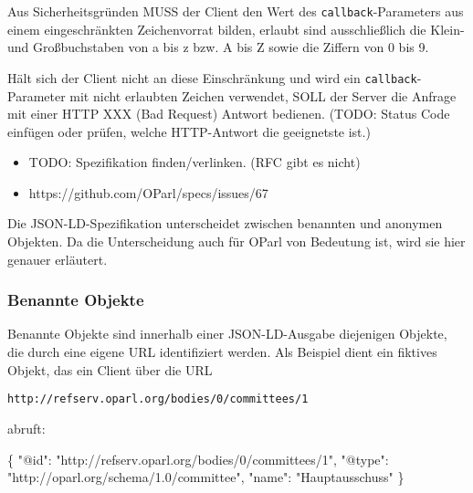 \documentclass[,a4paper]{article}
\newenvironment{Shaded}{}{}
\newcommand{\DataTypeTok}[1]{\textcolor[rgb]{0.56,0.13,0.00}{{#1}}}
\newcommand{\StringTok}[1]{\textcolor[rgb]{0.25,0.44,0.63}{{#1}}}
\newcommand{\NormalTok}[1]{{#1}}
\begin{document}
Aus Sicherheitsgründen MUSS der Client den Wert des
\texttt{callback}-Parameters aus einem eingeschränkten Zeichenvorrat
bilden, erlaubt sind ausschließlich die Klein- und Großbuchstaben von a
bis z bzw. A bis Z sowie die Ziffern von 0 bis 9.

Hält sich der Client nicht an diese Einschränkung und wird ein
\texttt{callback}-Parameter mit nicht erlaubten Zeichen verwendet, SOLL
der Server die Anfrage mit einer HTTP XXX (Bad Request) Antwort
bedienen. (TODO: Status Code einfügen oder prüfen, welche HTTP-Antwort
die geeignetste ist.)

\begin{itemize}
\itemsep1pt\parskip0pt
\item
  TODO: Spezifikation finden/verlinken. (RFC gibt es nicht)
\item
  https://github.com/OParl/specs/issues/67
\end{itemize}


Die JSON-LD-Spezifikation unterscheidet zwischen benannten und anonymen
Objekten. Da die Unterscheidung auch für OParl von Bedeutung ist, wird
sie hier genauer erläutert.

\subsubsection{Benannte Objekte}\label{benannte-objekte}

Benannte Objekte sind innerhalb einer JSON-LD-Ausgabe diejenigen
Objekte, die durch eine eigene URL identifiziert werden. Als Beispiel
dient ein fiktives Objekt, das ein Client über die URL

\begin{verbatim}
http://refserv.oparl.org/bodies/0/committees/1
\end{verbatim}

abruft:

\begin{Shaded}
\begin{Highlighting}[]
\NormalTok{\{}
    \DataTypeTok{"@id"}\NormalTok{: }\StringTok{"http://refserv.oparl.org/bodies/0/committees/1"}\NormalTok{,}
    \DataTypeTok{"@type"}\NormalTok{: }\StringTok{"http://oparl.org/schema/1.0/committee"}\NormalTok{,}
    \DataTypeTok{"name"}\NormalTok{: }\StringTok{"Hauptausschuss"}
\NormalTok{\}}
\end{Highlighting}
\end{Shaded}
\end{document}
